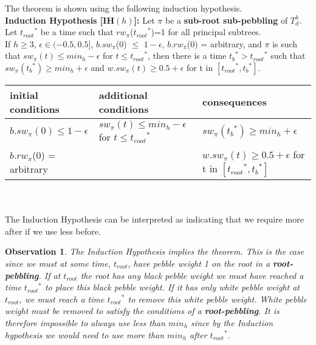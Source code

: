 \documentclass[12pt]{article}
\newtheorem{obs}[theorem]{Observation}
\newcommand{\troot}{t_{root}}
\newcommand{\troots}{{t_{root}}^*}
\newcommand{\tbs}{{t_b}^{*}}
\begin{document}
The theorem is shown using the following induction hypothesis.\\

\noindent
{\bf Induction Hypothesis [IH$(h)$]:} Let $\pi$ be a {\bf sub-root sub-pebbling}
of $T^h_d$. Let $\troots$ be a time such that $rw_\pi$($\troots$)=1 for all principal subtrees.\\

If $h\geq 3$, $\epsilon \in (-0.5,0.5]$, $b.sw_{\pi}$(0) $\leq$ $1-\epsilon$, $b.rw_{\pi}$(0) = arbitrary, 
and $\pi$ is such that $sw_\pi(t) \leq min_h-\epsilon$ for $t \leq \troots$, then there is a time $\tbs > \troots$ such that $sw_\pi(\tbs) \geq min_h+\epsilon$ and $w.sw_\pi(t) \geq 0.5+\epsilon$ for t in $[\troots, \tbs]$.\\

\begin{tabular} { |l|l|l|}\hline
initial conditions & additional conditions & consequences\\\hline
$b.sw_{\pi}(0) \leq 1-\epsilon$ & $sw_\pi(t) \leq min_h-\epsilon$ for $t \leq \troots$ & $sw_\pi(\tbs) \geq min_h+\epsilon$\\\hline
$b.rw_{\pi}$(0) = arbitrary & & $w.sw_\pi(t) \geq 0.5+\epsilon$ for t in $[\troots, \tbs]$\\\hline
\end{tabular}\\\\

The Induction Hypothesis can be interpreted as indicating that we require more after if we use less before.

\noindent
\begin{obs}
The Induction Hypothesis implies the theorem. 
This is the case since we must at some time, $\troot$, have pebble weight 1 on the root in a {\bf root-pebbling}. If at $\troot$ the root has any black pebble weight we must have reached a time $\troots$ to place this black pebble weight. If it has only white pebble weight at $\troot$, we must reach a time $\troots$ to remove this white pebble weight. White pebble weight must be removed to satisfy the conditions of a {\bf root-pebbling}. It is therefore impossible to always use less than $min_h$ since by the Induction hypothesis we would need to use more than $min_h$ after $\troots$.\\
\end{obs}
\end{document}
